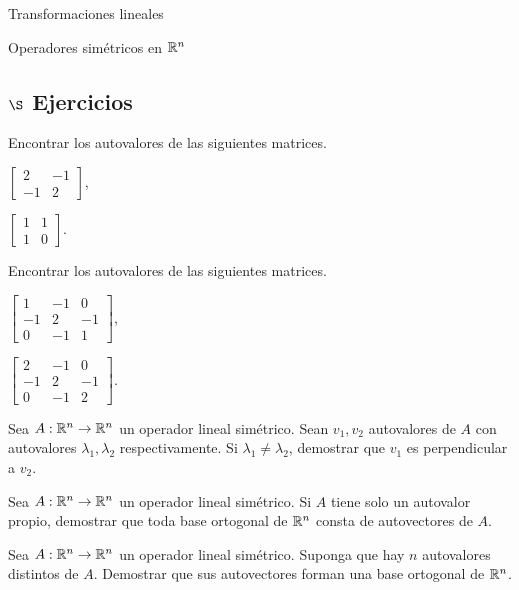 \begin{chapter}{Transformaciones lineales}
\begin{section}{Operadores simétricos en $\mathbb R^n$}
    \subsection*{$\S$ Ejercicios}
    \begin{enumex}
       \item Encontrar los autovalores de las siguientes matrices.
       \begin{enumex}
        \begin{minipage}{0.3\textwidth}
            \item $\begin{bmatrix} 2&-1\\-1&2 \end{bmatrix}$,
        \end{minipage}
        \begin{minipage}{0.3\textwidth}
            \item $\begin{bmatrix} 1&1\\1&0 \end{bmatrix}$.
        \end{minipage}
       \end{enumex}
       \item Encontrar los autovalores de las siguientes matrices.
       \begin{enumex}
        \begin{minipage}{0.3\textwidth}
            \item $\begin{bmatrix} 1&-1&0\\-1&2&-1 \\0&-1&1\end{bmatrix}$,
        \end{minipage}
        \begin{minipage}{0.3\textwidth}
            \item $\begin{bmatrix} 2&-1&0\\-1&2&-1\\0&-1&2 \end{bmatrix}$.
        \end{minipage}
       \end{enumex}
        \item Sea $A: \mathbb R^n \to \mathbb R^n$ un operador  lineal simétrico. Sean $v_1, v_2$ autovalores de $A$ con autovalores $\lambda_1, \lambda_2$ respectivamente. Si $\lambda_1 \ne \lambda_2$, demostrar que $v_1$ es perpendicular a $v_2$.
        \item Sea $A: \mathbb R^n \to \mathbb R^n$ un operador  lineal simétrico. Si $A$ tiene solo un autovalor propio, demostrar que toda base ortogonal de $\mathbb R^n$ consta de autovectores de $A$.
        \item  Sea $A: \mathbb R^n \to \mathbb R^n$ un operador  lineal simétrico. Suponga que hay $n$ autovalores  distintos de $A$. Demostrar que sus autovectores forman una base ortogonal de $\mathbb R^n$.
    \end{enumex}

    \end{section}

        
    \end{chapter}